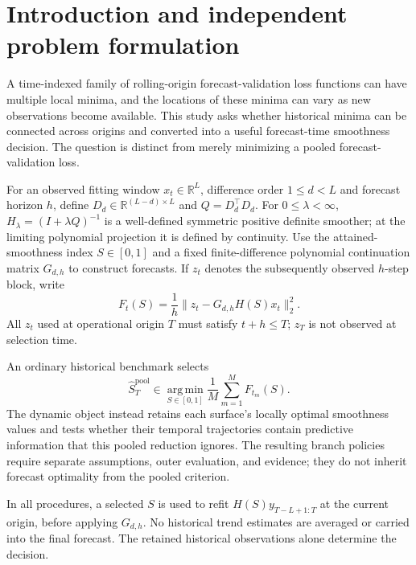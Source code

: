 \section{Introduction and independent problem formulation}
\label{sec:branch_introduction}
A time-indexed family of rolling-origin forecast-validation loss
functions can have multiple local minima, and the locations of
these minima can vary as new observations become available.
This study asks whether historical minima can be connected
across origins and converted into a useful forecast-time
smoothness decision. The question is distinct from merely
minimizing a pooled forecast-validation loss.

For an observed fitting window $x_t\in\mathbb R^L$,
difference order $1\le d<L$ and forecast horizon $h$,
define $D_d\in\mathbb R^{(L-d)\times L}$ and
$Q=D_d^\top D_d$. For $0\le\lambda<\infty$,
$H_\lambda=(I+\lambda Q)^{-1}$ is a well-defined
symmetric positive definite smoother; at the limiting
polynomial projection it is defined by continuity.
Use the attained-smoothness index $S\in[0,1]$ and a
fixed finite-difference polynomial continuation matrix
$G_{d,h}$ to construct forecasts. If $z_t$ denotes
the subsequently observed $h$-step block, write
\begin{equation}
\label{eq:branch_origin_mse}
F_t(S)=\frac{1}{h}
\|z_t-G_{d,h}H(S)x_t\|_2^2.
\end{equation}
All $z_t$ used at operational origin $T$ must satisfy
$t+h\le T$; $z_T$ is not observed at selection time.

An ordinary historical benchmark selects
\begin{equation}
\label{eq:F_S}
\widehat S_T^{\mathrm{pool}}
\in\operatorname*{arg\,min}_{S\in[0,1]}
\frac{1}{M}\sum_{m=1}^M F_{t_m}(S).
\end{equation}
The dynamic object instead retains each surface's
locally optimal smoothness values and tests whether
their temporal trajectories contain predictive
information that this pooled reduction ignores.
The resulting branch policies require separate
assumptions, outer evaluation, and evidence; they
do not inherit forecast optimality from the pooled
criterion.

In all procedures, a selected $S$ is used to refit
$H(S)y_{T-L+1:T}$ at the current origin, before applying
$G_{d,h}$. No historical trend estimates are averaged
or carried into the final forecast. The retained
historical observations alone determine the decision.
